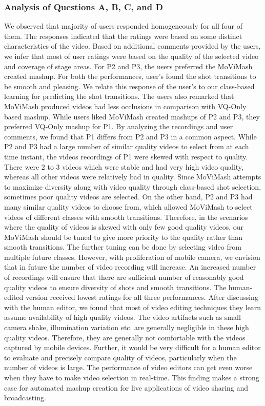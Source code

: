 \documentclass{sig-alternate}
\begin{document}
    \subsubsection{Analysis of Questions A, B, C, and D}
    We observed that majority of users responded homogeneously for all four of them. The responses indicated that the ratings were based on some distinct characteristics of the video. Based on additional comments provided by the users, we infer that most of user ratings were based on the quality of the selected video and coverage of stage areas.
    For P2 and P3, the users preferred the MoViMash created mashup. For both the performances, user’s found the shot transitions to be smooth and pleasing. We relate this response of the user’s to our class-based learning for predicting the shot transitions. The users also remarked that MoViMash produced videos had less occlusions in comparison with VQ-Only based mashup.
    While users liked MoViMash created mashups of P2 and P3, they preferred VQ-Only mashup for P1. By analyzing the recordings and user comments, we found that P1 differs from P2 and P3 in a common aspect. While P2 and P3 had a large number of similar quality videos to select from at each time instant, the videos recordings of P1 were skewed with respect to quality. There were 2 to 3 videos which were stable and had very high video quality, whereas all other videos were relatively bad in quality. Since MoViMash attempts to maximize diversity along with video quality through class-based shot selection, sometimes poor quality videos are selected.
    On the other hand, P2 and P3 had many similar quality videos to choose from, which allowed MoViMash to select videos of different classes with smooth transitions. Therefore, in the scenarios where the quality of videos is skewed with only few good quality videos, our MoViMash should be tuned to give more priority to the quality rather than smooth transitions. The further tuning can be done by selecting video from multiple future classes. However, with proliferation of mobile camera, we envision that in future the number of video recording will increase. An increased number of recordings will ensure that there are sufficient number of reasonably good quality videos to ensure diversity of shots and smooth transitions.
    The human-edited version received lowest ratings for all three performances. After discussing with the human editor, we found that most of video editing techniques they learn assume availability of high quality videos. The video artifacts such as small camera shake, illumination variation etc. are generally negligible in these high quality videos. Therefore, they are generally not comfortable with the videos captured by mobile devices. Further, it would be very difficult for a human editor to evaluate and precisely compare quality of videos, particularly when the number of videos is large. The performance of video editors can get even worse when they have to make video selection in real-time. This finding makes a strong case for automated mashup creation for live applications of video sharing and broadcasting.
\end{document}
